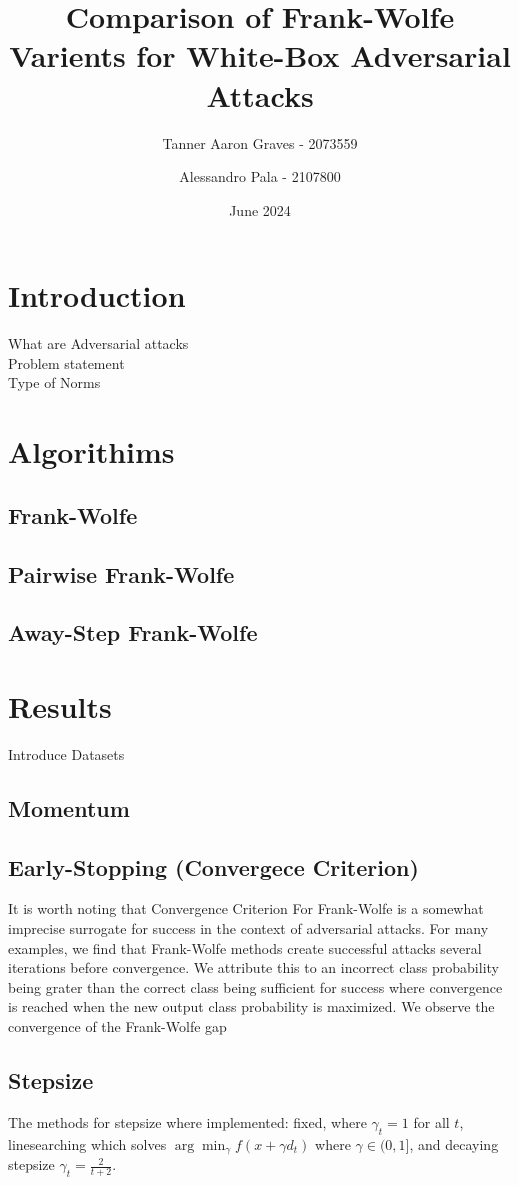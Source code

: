 \documentclass{article}
\title{Comparison of Frank-Wolfe Varients for White-Box Adversarial Attacks}
\author{Tanner Aaron Graves - 2073559\and Alessandro Pala - 2107800}
\date{June 2024}
\begin{document}
\maketitle

\section{Introduction}
What are Adversarial attacks\\
Problem statement\\
Type of Norms

\section{Algorithims}
\subsection{Frank-Wolfe}

\subsection{Pairwise Frank-Wolfe}
\subsection{Away-Step Frank-Wolfe}
\section{Results}
Introduce Datasets
\subsection{Momentum}
\subsection{Early-Stopping (Convergece Criterion)}
It is worth noting that Convergence Criterion For Frank-Wolfe is a somewhat imprecise surrogate for success in the context of adversarial attacks. For many examples, we find that Frank-Wolfe methods create successful attacks several iterations before convergence. We attribute this to an incorrect class probability being grater than the correct class being sufficient for success where convergence is reached when the new output class probability is maximized. 
We observe the convergence of the Frank-Wolfe gap 
\subsection{Stepsize}
The methods for stepsize where implemented: fixed, where $\gamma_t = 1$ for all $t$, linesearching which solves $\arg \min _\gamma f(x + \gamma d_t)$ where $\gamma \in (0,1]$, and decaying stepsize $\gamma_t = \frac{2}{t + 2}$.
\end{document}
